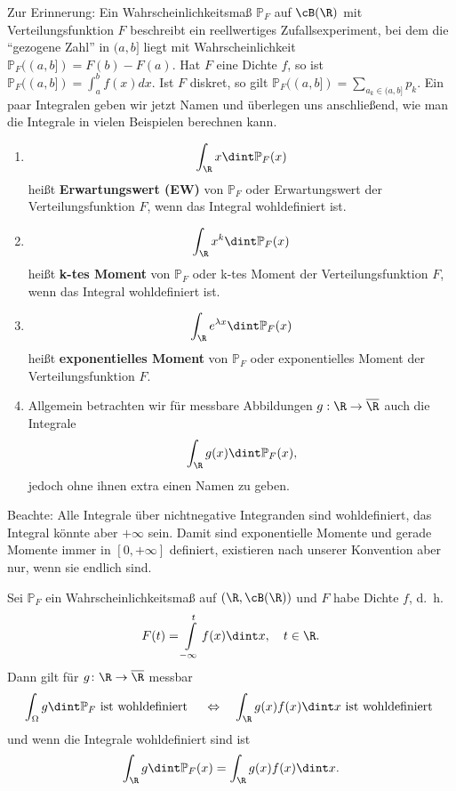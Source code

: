 Zur Erinnerung: Ein Wahrscheinlichkeitsmaß $\mathbb{P}_F$ auf $\cB(\R)$ mit Verteilungsfunktion $F$ beschreibt ein reellwertiges Zufallsexperiment, bei dem die \enquote{gezogene Zahl} in $(a,b]$ liegt mit Wahrscheinlichkeit $\mathbb{P}_F((a,b]) = F(b) - F(a)$. Hat $F$ eine Dichte $f$, so ist $\mathbb{P}_F((a,b]) =\int_a^b f(x)dx$. Ist $F$ diskret, so gilt $\mathbb P_F((a,b])=\sum_{a_k\in (a,b]} p_k$. Ein paar Integralen geben wir jetzt Namen und \"uberlegen uns anschlie\ss end, wie man die Integrale in vielen Beispielen berechnen kann.
\begin{deff}\abs
	\begin{enumerate}[label=(\roman*)]
		\item \[ \int_{\R} x \dint \mathbb{P}_F(x) \] heißt \textbf{Erwartungswert (EW)} von $ \mathbb{P}_F $ oder Erwartungswert der Verteilungsfunktion $F$, wenn das Integral wohldefiniert ist.
		\item \[ \int_{\R} x^k \dint \mathbb{P}_F(x) \] heißt \textbf{k-tes Moment} von $ \mathbb{P}_F $ oder k-tes Moment der Verteilungsfunktion $F$, wenn das Integral wohldefiniert ist.
		\item \[ \int_{\R} e^{\lambda x} \dint \mathbb{P}_F(x) \] heißt \textbf{exponentielles Moment} von $ \mathbb{P}_F $ oder exponentielles Moment der Verteilungsfunktion $F$.
		\item Allgemein betrachten wir f\"ur messbare Abbildungen $g:\R\to \overline \R$ auch die Integrale 
		\[ \int_{\R} g(x) \dint \mathbb{P}_F(x), \] 
		jedoch ohne ihnen extra einen Namen zu geben.
	\end{enumerate}
	Beachte: Alle Integrale \"uber nichtnegative Integranden sind wohldefiniert, das Integral k\"onnte aber $+\infty$ sein. Damit sind exponentielle Momente und gerade Momente immer in $[0,+\infty]$ definiert, existieren nach unserer Konvention aber nur, wenn sie endlich sind.
\end{deff}

\begin{satz}\label{IntDichten}
	Sei $\mathbb{P}_F$ ein Wahrscheinlichkeitsmaß auf $(\R, \cB(\R))$ und $F$ habe Dichte $f$, \mbox{d. h.} \[ F(t) = \int\limits_{-\infty}^{t} f(x) \dint x,\quad t\in\R. \]
	Dann gilt für $g\colon \R \to \overline{\R}$ messbar \[ \int_{\Omega} g \dint \mathbb{P}_F \text{ ist wohldefiniert }\quad \Leftrightarrow\quad \int_{\R} g(x) f(x) \dint x \text{ ist wohldefiniert } \]
	und wenn die Integrale wohldefiniert sind ist \[ \int_{\R} g \dint \mathbb{P}_F(x) = \int_{\R} g(x) f(x) \dint x. \]
\end{satz}

